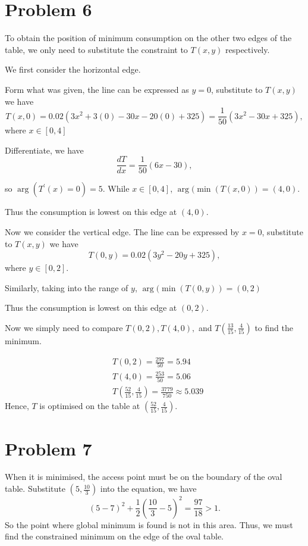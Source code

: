 \documentclass[12pt,a4paper]{article}
\begin{document}
\section*{Problem 6}
To obtain the position of minimum consumption on the other two edges of the table, we only need to substitute the constraint to $T(x,y)$ respectively.

We first consider the horizontal edge.

Form what was given, the line can be expressed as $y=0$, substitute to $T(x,y)$ we have
\[
{T}({x}, 0)=0.02\left(3 x^2+3(0)-30 x-20(0)+325\right) = \frac{1}{50}\left(3 x^2-30 x+325\right),
\]
where $x\in[0,4]$

Differentiate, we have
\[
\frac{dT}{dx} = \frac{1}{50}(6x-30),
\]

so $\arg({T^\prime(x)=0})=5$. While $x\in[0,4]$, $\arg(\min(T(x,0)) = (4,0)$.

Thus the consumption is lowest on this edge at $(4,0)$.

Now we consider the vertical edge.
The line can be expressed by $x = 0$, substitute to $T(x,y)$ we have
\[
{T}(0, {y})=0.02\left(3 y^2-20 y+325\right),
\]
where $y\in[0,2]$.

Similarly, taking into the range of $y$, $\arg(\min(T(0,y)) = (0,2)$

Thus the consumption is lowest on this edge at $(0,2)$.

Now we simply need to compare $T(0,2), T(4,0),$ and $T\left(\frac{13}{15}, \frac{4}{15}\right)$ to find the minimum.

$$\begin{aligned}
& T(0,2)=\frac{297}{50}=5.94 \\
& T(4,0)=\frac{253}{50}=5.06 \\
& T\left(\frac{52}{15}, \frac{4}{15}\right)=\frac{3779}{750} \approx 5.039
\end{aligned}$$
Hence, $T$ is optimised on the table at $\left(\frac{52}{15}, \frac{4}{15}\right)$.
\section*{Problem 7}
\begin{solution}
When it is minimised, the access point must be on the boundary of the oval table. Substitute $\left(5, \frac{10}{3}\right)$ into the equation, we have 
\[
(5-7)^2+\frac{1}{2}(\frac{10}{3}-5)^2 = \frac{97}{18}>1.
\]
So the point where global minimum is found is not in this area. Thus, we must find the constrained minimum on the edge of the oval table.
\end{solution}
\end{document}
